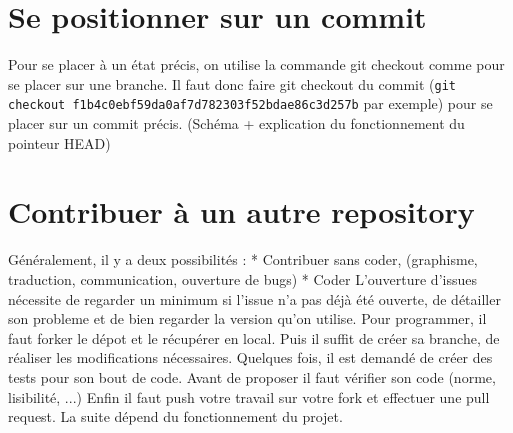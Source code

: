 \documentclass[a4paper,10pt]{report}
\begin{document}
  \section{Se positionner sur un commit}
  Pour se placer à un état précis, on utilise la commande git checkout comme pour se placer sur une branche. Il faut donc faire git checkout \no du commit (\verb|git checkout f1b4c0ebf59da0af7d782303f52bdae86c3d257b| par exemple) pour se placer sur un commit précis.
  (Schéma + explication du fonctionnement du pointeur HEAD)
  \section{Contribuer à un autre repository}
Généralement, il y a deux possibilités : 
* Contribuer sans coder, (graphisme, traduction, communication, ouverture de bugs)
* Coder
L'ouverture d'issues nécessite de regarder un minimum si l'issue n'a pas déjà été ouverte, de détailler son probleme et de bien regarder la version qu'on utilise.
Pour programmer, il faut forker le dépot et le récupérer en local.
Puis il suffit de créer sa branche, de réaliser les modifications nécessaires.
Quelques fois, il est demandé de créer des tests pour son bout de code.
Avant de proposer il faut vérifier son code (norme, lisibilité, ...)
Enfin il faut push votre travail sur votre fork et effectuer une pull request.
La suite dépend du fonctionnement du projet.
\end{document}

